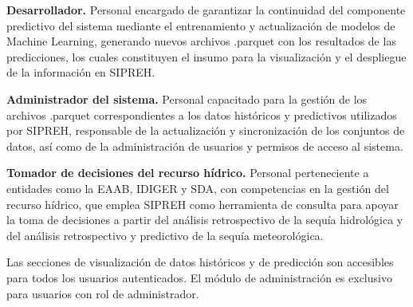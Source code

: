 \begin{definition}
\textbf{Desarrollador.} Personal encargado de garantizar la continuidad del componente predictivo del sistema mediante el entrenamiento y actualización de modelos de Machine Learning, generando nuevos archivos .parquet con los resultados de las predicciones, los cuales constituyen el insumo para la visualización y el despliegue de la información en SIPREH.
\end{definition}

\begin{definition}
\textbf{Administrador del sistema.} Personal capacitado para la gestión de los archivos .parquet correspondientes a los datos históricos y predictivos utilizados por SIPREH, responsable de la actualización y sincronización de los conjuntos de datos, así como de la administración de usuarios y permisos de acceso al sistema.
\end{definition}

\begin{definition}
\textbf{Tomador de decisiones del recurso hídrico.} Personal perteneciente a entidades como la EAAB, IDIGER y SDA, con competencias en la gestión del recurso hídrico, que emplea SIPREH como herramienta de consulta para apoyar la toma de decisiones a partir del análisis retrospectivo de la sequía hidrológica y del análisis retrospectivo y predictivo de la sequía meteorológica.
\end{definition}

\begin{remark}
Las secciones de visualización de datos históricos y de predicción son accesibles para todos los usuarios autenticados. El módulo de administración es exclusivo para usuarios con rol de administrador.
\end{remark}
